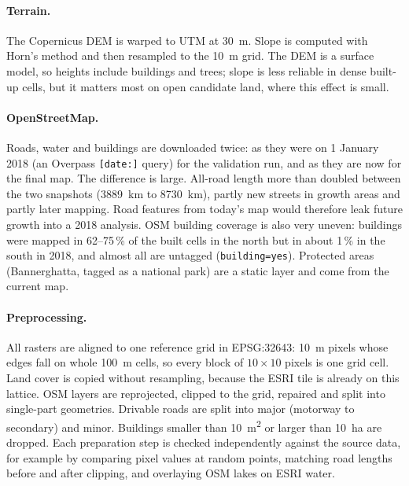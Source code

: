 \paragraph{Terrain.} The Copernicus DEM is warped to UTM at \SI{30}{\m}. Slope is computed with
Horn's method \citep{horn1981} and then resampled to the \SI{10}{\m} grid. The DEM is a surface
model, so heights include buildings and trees; slope is less reliable in dense built-up cells, but
it matters most on open candidate land, where this effect is small.

\paragraph{OpenStreetMap.} Roads, water and buildings are downloaded twice: as they were on
1 January 2018 (an Overpass \texttt{[date:]} query) for the validation run, and as they are now
for the final map. The difference is large. All-road length more than doubled between the two
snapshots (\SI{3889}{\km} to \SI{8730}{\km}), partly new streets in growth areas and partly later
mapping. Road features from today's map would therefore leak future growth into a 2018 analysis.
OSM building coverage is also very uneven: buildings were mapped in 62--75\,\% of the built cells
in the north but in about 1\,\% in the south in 2018, and almost all are untagged
(\texttt{building=yes}). Protected areas (Bannerghatta, tagged as a national park) are a static
layer and come from the current map.

\paragraph{Preprocessing.} All rasters are aligned to one reference grid in EPSG:32643: \SI{10}{\m}
pixels whose edges fall on whole \SI{100}{\m} cells, so every block of $10\times10$ pixels is one
grid cell. Land cover is copied without resampling, because the ESRI tile is already on this
lattice. OSM layers are reprojected, clipped to the grid, repaired and split into single-part
geometries. Drivable roads are split into major (motorway to secondary) and minor. Buildings
smaller than \SI{10}{\m\squared} or larger than \SI{10}{\hectare} are dropped. Each preparation
step is checked independently against the source data, for example by comparing pixel values at
random points, matching road lengths before and after clipping, and overlaying OSM lakes on ESRI
water.

